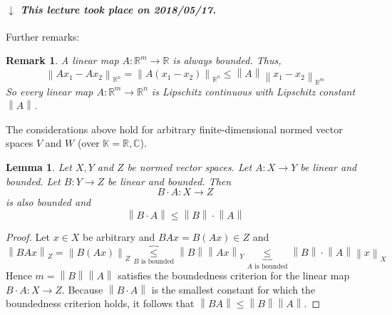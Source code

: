 \documentclass{article}
\newtheorem{lemma}{Lemma}  \numberwithin{lemma}{section}
\newtheorem{remark}{Remark}  \numberwithin{remark}{section}
\newcommand{\norm}[1]{\left\|#1\right\|}
\newcommand{\dateref}[1]{%
  \begin{mdframed}[backgroundcolor=gray!10,innerbottommargin=0pt,innertopmargin=0pt]
    \paragraph{\textit{$\downarrow$ This lecture took place on #1.}}%
  \end{mdframed}%
}
\begin{document}
\dateref{2018/05/17}

Further remarks:
\begin{remark}
  A linear map $A: \mathbb R^m \to \mathbb R$ is always bounded. Thus,
  \[ \norm{Ax_1 - Ax_2}_{\mathbb R^n} = \norm{A(x_1 - x_2)}_{\mathbb R^n} \leq \norm{A} \norm{x_1 - x_2}_{\mathbb R^m} \]
  So every linear map $A: \mathbb R^m \to \mathbb R^n$ is Lipschitz \emph{continuous} with Lipschitz constant $\norm{A}$.
\end{remark}

The considerations above hold for arbitrary finite-dimensional normed vector spaces $V$ and $W$ (over $\mathbb K = \mathbb R, \mathbb C$).

\begin{lemma} %
  Let $X, Y$ and $Z$ be normed vector spaces.
  Let $A: X \to Y$ be linear and bounded. Let $B: Y \to Z$ be linear and bounded.
  Then
  \[ B \cdot A: X \to Z \]
  is also bounded and
  \[ \norm{B \cdot A} \leq \norm{B} \cdot \norm{A} \]
\end{lemma}

\begin{proof}
  Let $x \in X$ be arbitrary and $BAx = B(Ax) \in Z$ and
  \[ \norm{BAx}_Z = \norm{B(Ax)}_Z \overbrace{\leq}_{B \text{ is bounded}} \norm{B} \norm{Ax}_Y \underbrace{\leq}_{A \text{ is bounded}} \norm{B} \cdot \norm{A} \norm{x}_X \]
  Hence $m = \norm B \norm A$ satisfies the boundedness criterion for the linear map $B \cdot A: X \to Z$. Because $\norm{B\cdot A}$ is the smallest constant
  for which the boundedness criterion holds, it follows that $\norm{BA} \leq \norm B \norm A$.
\end{proof}
\end{document}
